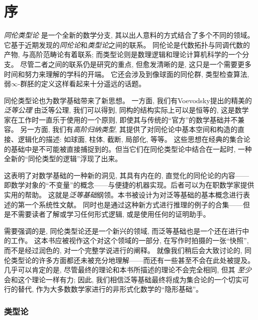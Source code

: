 \chapter*{序}
\setcounter{page}{1}


\emph{同伦类型论} 是一个全新的数学分支, 其以出人意料的方式结合了多个不同的领域。它基于近期发现的\emph{同伦论}和\emph{类型论}之间的联系。
同伦论是代数拓扑与同调代数的产物, 与高阶范畴论有着联系; 而类型论则是数理逻辑和理论计算机科学的一个分支。
尽管二者之间的联系仍是研究的重点, 但愈发清晰的是, 这只是一个需要更多时间和努力来理解的学科的开端。
它还会涉及到像球面的同伦群, 类型检查算法, 弱$\infty$-群胚的定义这样看起来十分遥远的话题。

同伦类型论也为数学基础带来了新思想。
%
一方面, 我们有Voevodsky提出的精美的\emph{泛等公理}
%
由泛等公理, 我们可以得到, 同构的结构实际上可以是恒等的, 这是数学家在工作时一直乐于使用的一个原则, 即使其与传统的``官方''的数学基础并不兼容。
另一方面, 我们有\emph{高阶归纳类型}, 其提供了对同伦论中基本空间和构造的直接、逻辑化的描述: 如球面, 柱体, 截断, 局部化, 等等。
这些思想在经典的集合论的基础中是不可能被直接捕捉到的。但当它们在同伦类型论中结合在一起时, 一种全新的``同伦类型的逻辑''浮现了出来。
%

这表明了对数学基础的一种新的洞见, 其具有内在的, 直觉化的同伦论的内容——
即数学对象的``不变量''的概念——与便捷的机器实现。后者可以为在职数学家提供实用的帮助。
这就是\emph{泛等基础}纲领。本书被设计为对泛等基础的基本概念进行表述的第一个系统性文献。
同时也是通过这种新方式进行推理的例子的合集——但是不需要读者了解或学习任何形式逻辑, 或是使用任何的证明助手。

\OPTwidow

需要强调的是, 同伦类型论还是一个新兴的领域, 而泛等基础也是一个还在进行中的工作。
这本书应被视作这个对这个领域的一部分, 在写作时拍摄的一张``快照'', 而不是经过润色的, 对一个完整学说进行的阐释。
就像我们稍后会大致讨论的, 同伦类型论的许多方面都还未被充分地理解——而还有一些甚至不会在此处被提及。
几乎可以肯定的是, 尽管最终的理论和本书所描述的理论不会完全相同, 但其 \emph{至少} 会和这个理论一样有力; 因此, 
我们相信泛等基础最终将成为集合论的一个切实可行的替代, 作为大多数数学家进行的非形式化数学的``隐形基础''。

\subsection*{类型论}


